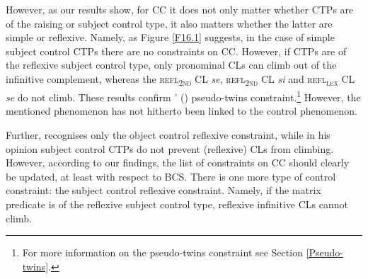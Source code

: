 However, as our results show, for CC it does not only matter whether CTPs are of the raising or subject control type, it also matters whether the latter are simple or reflexive. Namely, as Figure \ref{F16.1} suggests, in the case of simple subject control CTPs there are no constraints on CC. However, if CTPs are of the reflexive subject control type, only pronominal CLs can climb out of the infinitive complement, whereas the \textsc{refl\textsubscript{2nd}} CL \textit{se}, \textsc{refl\textsubscript{2nd}} CL \textit{si} and \textsc{refl\textsubscript{\textsc{lex}}} CL \textit{se} do not climb. These results confirm \citeauthor{Junghanns02}' (\citeyear[][79]{Junghanns02}) pseudo-twins constraint.\footnote{For more information on the pseudo-twins constraint see Section \ref{Pseudo-twins}.} However, the mentioned phenomenon has not hitherto been linked to the control phenomenon. 

Further, \citet[][]{Hana07} recognises only the object control reflexive constraint, while in his opinion subject control CTPs do not prevent (reflexive) CLs from climbing. However, according to our findings, the list of constraints on CC should clearly be updated, at least with respect to BCS. There is one more type of control constraint: the subject control reflexive constraint. Namely, if the matrix predicate is of the reflexive subject control type, reflexive infinitive CLs cannot climb.


